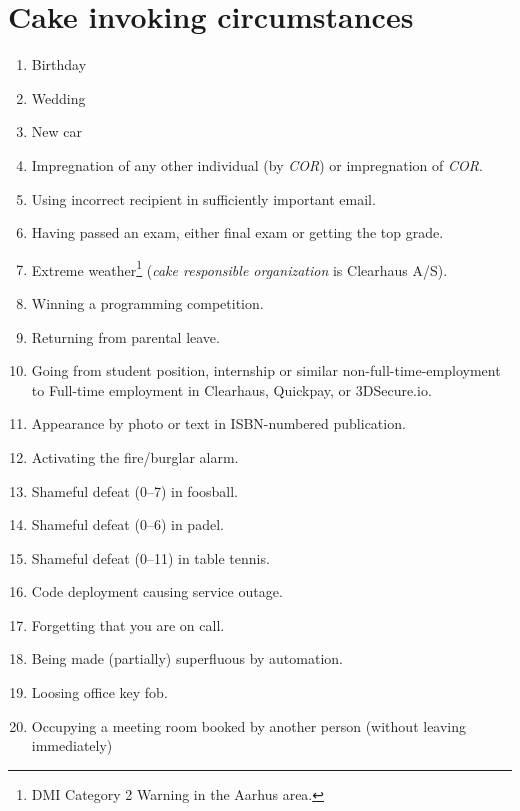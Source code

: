 \documentclass[a4paper, oneside, article]{memoir}
\newcounter{tbc}
\begin{document}
\chapter{Cake invoking circumstances}\label{chp:circumstances}
\begin{enumerate}[§ 1]
  \setcounter{enumi}{\value{tbc}}

  \item Birthday
  \item Wedding
  \item New car
  \item Impregnation of any other individual (by \emph{COR}) or impregnation of
    \emph{COR}.
  \item Using incorrect recipient in sufficiently important email.
  \item Having passed an exam, either final exam or getting the top grade.
  \item Extreme weather\footnote{DMI Category 2 Warning in the Aarhus area.} (\emph{cake responsible organization} is Clearhaus A/S).
  \item Winning a programming competition.
  \item Returning from parental leave.
  \item Going from student position, internship or similar non-full-time-employment to Full-time employment in Clearhaus, Quickpay, or 3DSecure.io.
  \item Appearance by photo or text in ISBN-numbered publication.
  \item Activating the fire/burglar alarm.
  \item Shameful defeat (0--7) in foosball.
  \item Shameful defeat (0--6) in padel.
  \item Shameful defeat (0--11) in table tennis.
  \item Code deployment causing service outage.
  \item Forgetting that you are on call.
  \item Being made (partially) superfluous by automation.
  \item Loosing office key fob.
  \item Occupying a meeting room booked by another person (without leaving immediately)
\end{enumerate}
\end{document}
